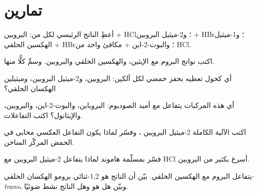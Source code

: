 \section{تمارين}

\begin{exercise}[$\star$]\label{exo:b1:electrophilic-additions:1}
أعطِ الناتج الرئيسي لكل من: البروبين + HCl؛ و2-ميثيل البروبين + HBr؛
و1-ميثيل الهكسين الحلقي + HBr؛ والبوت-2-اين + مكافئ واحد من HCl.
\end{exercise}

\begin{exercise}[$\star$]\label{exo:b1:electrophilic-additions:2}
اكتب نواتج البروم مع الإيثين، والهكسين الحلقي والبروبين. وسمِّ
كلًّا منها.
\end{exercise}

\begin{exercise}[$\star$]\label{exo:b1:electrophilic-additions:3}
أي كحول تعطيه  بحفز حمضي لكل ألكين:
البروبين، و2-ميثيل البروبين، وميثيلين الهكسان الحلقي؟
\end{exercise}

\begin{exercise}[$\star$]\label{exo:b1:electrophilic-additions:4}
أي هذه المركبات يتفاعل مع أميد الصوديوم: البروباين، والبوت-2-اين،
والبروبين، والإيثانول؟ اكتب التفاعلات.
\end{exercise}

\begin{exercise}[$\star\star$]\label{exo:b1:electrophilic-additions:5}
اكتب الآلية الكاملة  2-ميثيل البروبين ، وفسّر لماذا يكون التفاعل العكسي محابى في الحمض
المركّز الساخن.
\end{exercise}

\begin{exercise}[$\star\star$]\label{exo:b1:electrophilic-additions:6}
فسّر بمسلّمة هاموند لماذا يتفاعل 2-ميثيل البروبين مع HCl
أسرع بكثير من البروبين.
\end{exercise}

\begin{exercise}[$\star\star$]\label{exo:b1:electrophilic-additions:7}
يتفاعل البروم مع الهكسين الحلقي. بيّن أن الناتج هو
1,2-ثنائي برومو الهكسان الحلقي-\textit{trans}، وبيّن هل هو 
وهل الناتج نشط ضوئيًا.
\end{exercise}

